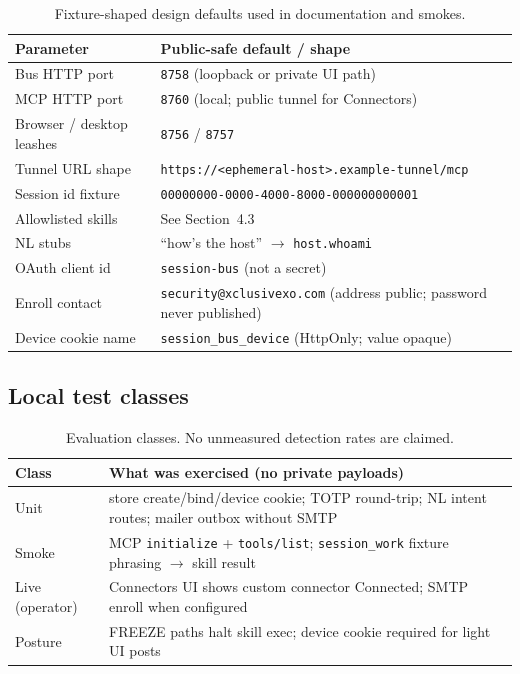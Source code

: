 \documentclass[11pt,a4paper]{article}
\begin{document}
\begin{table}[h]
\centering
\small
\begin{tabularx}{\textwidth}{@{}lX@{}}
\toprule
\textbf{Parameter} & \textbf{Public-safe default / shape} \\
\midrule
Bus HTTP port & \texttt{8758} (loopback or private UI path) \\
MCP HTTP port & \texttt{8760} (local; public tunnel for Connectors) \\
Browser / desktop leashes & \texttt{8756} / \texttt{8757} \\
Tunnel URL shape & \texttt{https://<ephemeral-host>.example-tunnel/mcp} \\
Session id fixture & \texttt{00000000-0000-4000-8000-000000000001} \\
Allowlisted skills & See Section~4.3 \\
NL stubs & ``how's the host'' $\rightarrow$ \texttt{host.whoami} \\
OAuth client id & \texttt{session-bus} (not a secret) \\
Enroll contact & \texttt{security@xclusivexo.com} (address public; password never published) \\
Device cookie name & \texttt{session\_bus\_device} (HttpOnly; value opaque) \\
\bottomrule
\end{tabularx}
\caption{Fixture-shaped design defaults used in documentation and smokes.}
\label{tab:defaults}
\end{table}

\subsection{Local test classes}

\begin{table}[h]
\centering
\small
\begin{tabularx}{\textwidth}{@{}lX@{}}
\toprule
\textbf{Class} & \textbf{What was exercised (no private payloads)} \\
\midrule
Unit & store create/bind/device cookie; TOTP round-trip; NL intent routes; mailer outbox without SMTP \\
Smoke & MCP \texttt{initialize} + \texttt{tools/list}; \texttt{session\_work} fixture phrasing $\rightarrow$ skill result \\
Live (operator) & Connectors UI shows custom connector Connected; SMTP enroll when configured \\
Posture & FREEZE paths halt skill exec; device cookie required for light UI posts \\
\bottomrule
\end{tabularx}
\caption{Evaluation classes. No unmeasured detection rates are claimed.}
\label{tab:tests}
\end{table}
\end{document}
